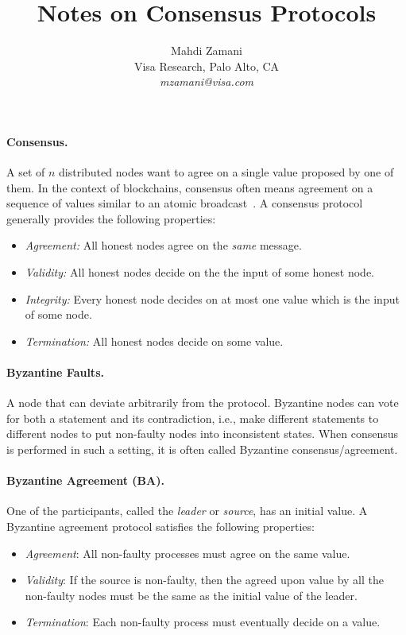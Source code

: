 \documentclass[11pt]{article}
\theoremstyle{mytheoremstyle}
\begin{document}
\title{Notes on Consensus Protocols}

\author{Mahdi Zamani\\ Visa Research, Palo Alto, CA \\ \textit{mzamani@visa.com}}
\date{}

\maketitle

\paragraph{Consensus.}
A set of $n$ distributed nodes want to agree on a single value proposed by one of them. In the context of blockchains, consensus often means agreement on a sequence of values similar to an atomic broadcast~\cite{DBLP:journals/corr/CachinV17}. A consensus protocol generally provides the following properties:

\begin{itemize}
	\item \textit{Agreement:} All honest nodes agree on the \emph{same} message.
	\item \textit{Validity:} All honest nodes decide on the the input of some honest node.
	\item \textit{Integrity:} Every honest node decides on at most one value which is the input of some node.
	\item \textit{Termination:} All honest nodes decide on some value.
\end{itemize}

\paragraph{Byzantine Faults.} A node that can deviate arbitrarily from the protocol. Byzantine nodes can vote for both a statement and its contradiction, i.e., make different statements to different nodes to put non-faulty nodes into inconsistent states. When consensus is performed in such a setting, it is often called Byzantine consensus/agreement.

\paragraph{Byzantine Agreement (BA).} One of the participants, called the \emph{leader} or \emph{source}, has an initial value. A Byzantine agreement protocol satisfies the following properties:
\begin{itemize}
	\item \emph{Agreement}: All non-faulty processes must agree on the same value. 
	\item \emph{Validity}: If the source is non-faulty, then the agreed upon value by all the non-faulty nodes must be the same as the initial value of the leader.
	\item \emph{Termination}: Each non-faulty process must eventually decide on a value.
\end{itemize}
\end{document}
